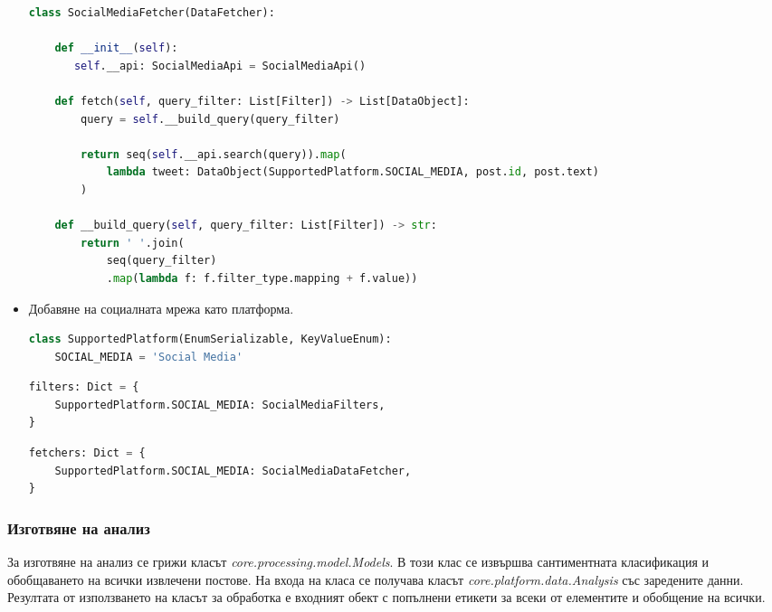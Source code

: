 \documentclass{article}
\begin{document}
\begin{itemize}
\begin{lstlisting}[language=Python, caption=Дефиниция на извличането на данни от новата социална мрежа.]
class SocialMediaFetcher(DataFetcher):

    def __init__(self):
       self.__api: SocialMediaApi = SocialMediaApi()

    def fetch(self, query_filter: List[Filter]) -> List[DataObject]:
        query = self.__build_query(query_filter)

        return seq(self.__api.search(query)).map(
            lambda tweet: DataObject(SupportedPlatform.SOCIAL_MEDIA, post.id, post.text)
        )

    def __build_query(self, query_filter: List[Filter]) -> str:
        return ' '.join(
            seq(query_filter)
            .map(lambda f: f.filter_type.mapping + f.value))
\end{lstlisting}

  \item Добавяне на социалната мрежа като платформа.

\begin{lstlisting}[language=Python, caption=Дефиниране на нова платформа за социална мрежа в \textit{core.platform. supported\_platforms.SupportedPlatform}.]
class SupportedPlatform(EnumSerializable, KeyValueEnum):
    SOCIAL_MEDIA = 'Social Media'
\end{lstlisting}

\begin{lstlisting}[language=Python, caption=Дефиниране на филтър за социалната мрежа в \textit{core.platform.platform\_facade.filters}.]
filters: Dict = {
    SupportedPlatform.SOCIAL_MEDIA: SocialMediaFilters,
}
\end{lstlisting}

\begin{lstlisting}[language=Python, caption=Дефиниране на клас за извличане на данни от социалната мрежа в \textit{core.platform.platform\_facade.fetchers}.]
fetchers: Dict = {
    SupportedPlatform.SOCIAL_MEDIA: SocialMediaDataFetcher,
}
\end{lstlisting}

\end{itemize}

\subsubsection{Изготвяне на анализ}

За изготвяне на анализ се грижи класът \textit{core.processing.model.Models}. В този клас се извършва сантиментната
класификация и обобщаването на всички извлечени постове. На входа на класа се получава класът
\textit{core.platform.data.Analysis} със заредените данни. Резултата от използването на класът за обработка е входният
обект с попълнени етикети за всеки от елементите и обобщение на всички.
\end{document}
